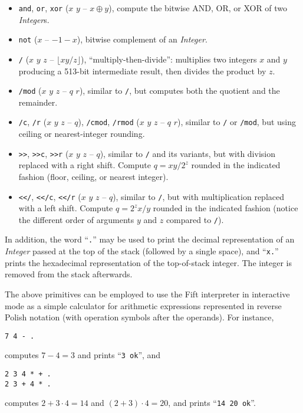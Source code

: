 \documentclass[12pt,oneside]{article}
\begin{document}
\begin{itemize}
\item {\tt and}, {\tt or}, {\tt xor} ($x$ $y$ -- $x\oplus y$), compute the bitwise AND, OR, or XOR of two {\em Integer\/}s.
\item {\tt not} ($x$ -- $-1-x$), bitwise complement of an {\em Integer}.
\item {\tt */} ($x$ $y$ $z$ -- $\lfloor xy/z\rfloor$), ``multiply-then-divide'': multiplies two integers $x$ and $y$ producing a 513-bit intermediate result, then divides the product by $z$.
\item {\tt */mod} ($x$ $y$ $z$ -- $q$ $r$), similar to {\tt */}, but computes both the quotient and the remainder.
\item {\tt */c}, {\tt */r} ($x$ $y$ $z$ -- $q$), {\tt */cmod}, {\tt */rmod} ($x$ $y$ $z$ -- $q$ $r$), similar to {\tt */} or {\tt */mod}, but using ceiling or nearest-integer rounding.
\item {\tt *>{}>}, {\tt *>{}>c}, {\tt *>{}>r} ($x$ $y$ $z$ -- $q$), similar to {\tt */} and its variants, but with division replaced with a right shift. Compute $q=xy/2^z$ rounded in the indicated fashion (floor, ceiling, or nearest integer).
\item {\tt <{}</}, {\tt <{}</c}, {\tt <{}</r} ($x$ $y$ $z$ -- $q$), similar to {\tt */}, but with multiplication replaced with a left shift. Compute $q=2^zx/y$ rounded in the indicated fashion (notice the different order of arguments $y$ and $z$ compared to {\tt */}).
\end{itemize}

In addition, the word ``{\tt .}'' may be used to print the decimal representation of an {\em Integer\/} passed at the top of the stack (followed by a single space), and ``{\tt x.}'' prints the hexadecimal representation of the top-of-stack integer. The integer is removed from the stack afterwards.

The above primitives can be employed to use the Fift interpreter in interactive mode as a simple calculator for arithmetic expressions represented in reverse Polish notation (with operation symbols after the operands). For instance,
\begin{verbatim}
7 4 - .
\end{verbatim}
computes $7-4=3$ and prints ``{\tt 3 ok}'', and
\begin{verbatim}
2 3 4 * + .
2 3 + 4 * .
\end{verbatim}
computes $2+3\cdot 4=14$ and $(2+3)\cdot 4=20$, and prints ``{\tt 14 20 ok}''.
\end{document}
